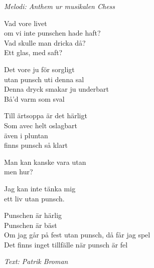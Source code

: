 {\footnotesize\textit{Melodi: Anthem ur musikalen Chess}}\par
\vspace{10pt}
Vad vore livet\\
om vi inte punschen hade haft?\\
Vad skulle man dricka då?\\
Ett glas, med saft?\par
\vspace{10pt}
Det vore ju för sorgligt\\
utan punsch uti denna sal\\
Denna dryck smakar ju underbart\\
Bå'd varm som sval\par
\vspace{10pt}
Till ärtsoppa är det härligt\\
Som avec helt oslagbart\\
även i pluntan\\
finns punsch så klart\par
\vspace{10pt}
Man kan kanske vara utan\\
men hur?\par
\vspace{10pt}
Jag kan inte tänka mig\\
ett liv utan punsch.\par
\vspace{10pt}
Punschen är härlig\\
Punschen är bäst\\
Om jag går på fest utan punsch, då får jag spel\\
Det finns inget tillfälle när punsch är fel\par
\vspace{10pt}
{\footnotesize\textit{Text: Patrik Broman}}
